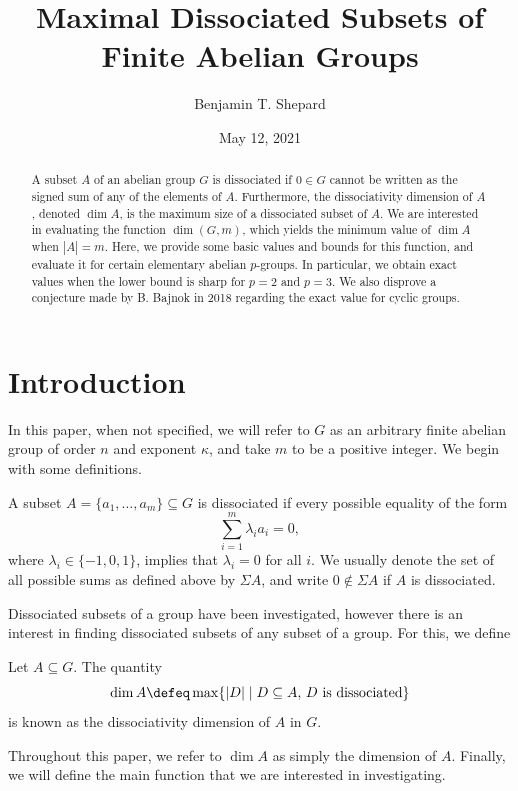 \documentclass[ml]{ShepardPAPER}
\title{Maximal Dissociated Subsets of Finite Abelian Groups}
\author{Benjamin T. Shepard}
\date{May 12, 2021}
\begin{document}
\TITLE

\begin{abstract}
    A subset $A$ of an abelian group $G$ is dissociated if $0\in G$ cannot be written as the signed sum of any of the elements of $A$. Furthermore, the dissociativity dimension of $A$, denoted $\dim A$, is the maximum size of a dissociated subset of $A$. We are interested in evaluating the function $\dim(G, m)$, which yields the minimum value of $\dim A$ when $|A|=m$. Here, we provide some basic values and bounds for this function, and evaluate it for certain elementary abelian $p$-groups. In particular, we obtain exact values when the lower bound is sharp for $p=2$ and $p=3$. We also disprove a conjecture made by B. Bajnok in 2018 regarding the exact value for cyclic groups.
\end{abstract}

\tableofcontents

\section{Introduction}

In this paper, when not specified, we will refer to $G$ as an arbitrary finite abelian group of order $n$ and exponent $\kappa$, and take $m$ to be a positive integer. We begin with some definitions.

\begin{definition}
    A subset $A=\{a_1,\ldots,a_m\}\subseteq G$ is dissociated if every possible equality of the form
    \[\sum_{i=1}^m \lambda_i a_i = 0,\]
    where $\lambda_i\in\{-1,0,1\}$, implies that $\lambda_i=0$ for all $i$. We usually denote the set of all possible sums as defined above by $\Sigma A$, and write $0\notin\Sigma A$ if $A$ is dissociated.
\end{definition}

Dissociated subsets of a group have been investigated, however there is an interest in finding dissociated subsets of any subset of a group. For this, we define

\begin{definition}
Let $A\subseteq G$. The quantity
    \[\dim A \defeq \max\{|D|\mid D \subseteq A,\, D\ \mathrm{is\ dissociated}\}\]
    is known as the dissociativity dimension of $A$ in $G$.
\end{definition}

Throughout this paper, we refer to $\dim A$ as simply the dimension of $A$. Finally, we will define the main function that we are interested in investigating.
\end{document}
